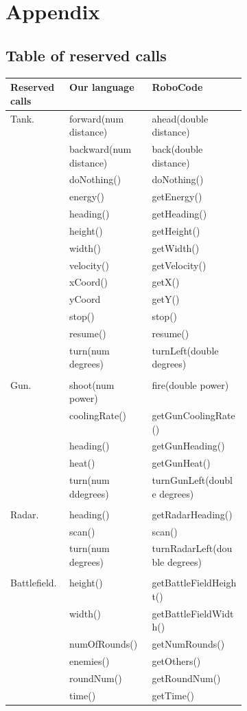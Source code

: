 \chapter{Appendix}
\section{Table of reserved calls}
\begin{center}
    \begin{tabular}{ | l| l | p{0.4\linewidth} | }
    \hline
    Reserved calls & Our language & RoboCode \\ \hline
    Tank. & forward(num distance) & ahead(double distance)  \\ \hline
     & backward(num distance) & back(double distance)  \\ \hline
     & doNothing() & doNothing() \\ \hline
     & energy() & getEnergy() \\ \hline
     & heading() & getHeading() \\ \hline
     & height() & getHeight() \\ \hline
     & width() & getWidth()  \\ \hline
     & velocity() & getVelocity()  \\ \hline
     & xCoord() & getX() \\ \hline
     & yCoord & getY() \\ \hline
     & stop() & stop() \\ \hline
     & resume() & resume() \\ \hline
     & turn(num degrees) & turnLeft(double degrees)  \\ \hline
     & &  \\ \hline
    Gun. & shoot(num power) & fire(double power) \\ \hline
     & coolingRate() & getGunCoolingRate() \\ \hline
     & heading() & getGunHeading() \\ \hline
     & heat() & getGunHeat() \\ \hline
     & turn(num ddegrees) & turnGunLeft(double degrees)  \\ \hline
     & &  \\ \hline
    Radar. & heading() & getRadarHeading() \\ \hline
     & scan() & scan() \\ \hline
     & turn(num degrees) & turnRadarLeft(double degrees) \\ \hline
     & &  \\ \hline
    Battlefield. & height() & getBattleFieldHeight() \\ \hline
     & width() & getBattleFieldWidth() \\ \hline
     & numOfRounds() & getNumRounds() \\ \hline
     & enemies() & getOthers() \\ \hline
     & roundNum() & getRoundNum() \\ \hline
     & time() & getTime()  \\
    \hline
    \end{tabular}
\end{center}

